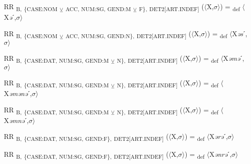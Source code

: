 {\begin{exe}
 RR \textsubscript{B,} \textsubscript{\{CASE:NOM} \textsubscript{${\veebar}$}\textsubscript{ ACC, NUM:SG, GEND:M} \textsubscript{${\veebar}$}\textsubscript{ F\},} \textsubscript{DET2[ART.INDEF]} ($\langle$X,$\sigma $$\rangle$) = \textsubscript{def} $\langle$X\textit{ə}ˊ,$\sigma $$\rangle$
\end{exe}

\begin{exe}
 RR \textsubscript{B,} \textsubscript{\{CASE:NOM} \textsubscript{${\veebar}$}\textsubscript{ ACC, NUM:SG, GEND:N\},} \textsubscript{DET2[ART.INDEF]} ($\langle$X,$\sigma $$\rangle$) = \textsubscript{def} $\langle$X\textit{əs}ˊ,$\sigma $$\rangle$
\end{exe}

\begin{exe}
 RR \textsubscript{B,} \textsubscript{\{CASE:DAT, NUM:SG, GEND:M} \textsubscript{${\veebar}$}\textsubscript{ N\},} \textsubscript{DET2[ART.INDEF]} ($\langle$X,$\sigma $$\rangle$) = \textsubscript{def} $\langle$X\textit{əmə}ˊ,$\sigma $$\rangle$
\end{exe}

\begin{exe}
 RR \textsubscript{B,} \textsubscript{\{CASE:DAT, NUM:SG, GEND:M} \textsubscript{${\veebar}$}\textsubscript{ N\},} \textsubscript{DET2[ART.INDEF]} ($\langle$X,$\sigma $$\rangle$) = \textsubscript{def} $\langle$X\textit{əmənə}ˊ,$\sigma $$\rangle$
\end{exe}

\begin{exe}
 RR \textsubscript{B,} \textsubscript{\{CASE:DAT, NUM:SG, GEND:M} \textsubscript{${\veebar}$}\textsubscript{ N\},} \textsubscript{DET2[ART.INDEF]} ($\langle$X,$\sigma $$\rangle$) = \textsubscript{def} $\langle$X\textit{əmnə}ˊ,$\sigma $$\rangle$
\end{exe}

\begin{exe}
 RR \textsubscript{B,} \textsubscript{\{CASE:DAT, NUM:SG, GEND:F\},} \textsubscript{DET2[ART.INDEF]} ($\langle$X,$\sigma $$\rangle$) = \textsubscript{def} $\langle$X\textit{ərə}ˊ,$\sigma $$\rangle$
\end{exe}

\begin{exe}
 RR \textsubscript{B,} \textsubscript{\{CASE:DAT, NUM:SG, GEND:F\},} \textsubscript{DET2[ART.INDEF]} ($\langle$X,$\sigma $$\rangle$) = \textsubscript{def} $\langle$X\textit{ənrə}ˊ,$\sigma $$\rangle$
\end{exe}

}
